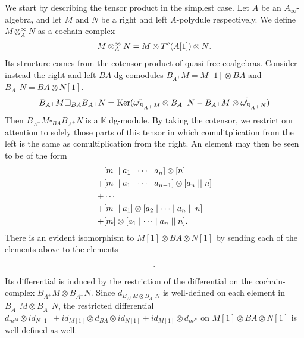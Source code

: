 \documentclass[../thesis.tex]{subfiles}
\begin{document}
            We start by describing the tensor product in the simplest case. Let $A$ be an $A_\infty$-algebra, and let $M$ and $N$ be a right and left $A$-polydule respectively. We define $M \otimes_A^\infty N$ as a cochain complex
            \begin{align*}
                M \otimes_A^\infty N = M \otimes T^c(A[1]) \otimes N\tt{.}
            \end{align*}
            Its structure comes from the cotensor product of quasi-free coalgebras. Consider instead the right and left $BA$ dg-comodules $B_{A^+}M = M[1] \otimes BA$ and $B_{A^+}N = BA \otimes N[1]$.
            \begin{align*}
                B_{A^+}M \square_{BA} B_{A^+}N = \tt{Ker}(\omega^r_{B_{A^+}M}\otimes B_{A^+}N - B_{A^+}M \otimes \omega^l_{B_{A^+}N})
            \end{align*}
            Then $B_{A^+}M \square_{BA} B_{A^+}N$ is a $\mathbb{K}$ dg-module. By taking the cotensor, we restrict our attention to solely those parts of this tensor in which comulitplication from the left is the same as comultiplication from the right. An element may then be seen to be of the form
            \begin{align*}
                & [m \mid\mid a_1 \mid \cdots \mid a_n] \otimes [n] \\ 
                + & [m \mid\mid a_1 \mid \cdots \mid a_{n-1}]\otimes [a_n \mid\mid n] \\
                + & \cdots \\
                + & [m \mid\mid a_1] \otimes [a_2 \mid \cdots \mid a_n \mid\mid n] \\ 
                + &
                 [m]\otimes [a_1\mid\cdots \mid a_n \mid\mid n]\tt{.}
            \end{align*}
            There is an evident isomorphism to $M[1]\otimes BA \otimes N[1]$ by sending each of the elements above to the elements
            \begin{align*}
                [m \mid\mid a_1 \mid \cdots \mid a_n \mid\mid n]\tt{.}
            \end{align*}
            Its differential is induced by the restriction of the differential on the cochain-complex $B_{A^+}M \otimes B_{A^+}N$. Since $d_{B_{A^+}M\otimes B_{A^+}N}$ is well-defined on each element in $B_{A^+}M \otimes B_{A^+}N$, the restricted differential $d_{m^M} \otimes id_{N[1]} + id_{M[1]}\otimes d_{BA} \otimes id_{N[1]} + id_{M[1]}\otimes d_{m^N}$ on $M[1] \otimes BA \otimes N[1]$ is well defined as well.
\end{document}
